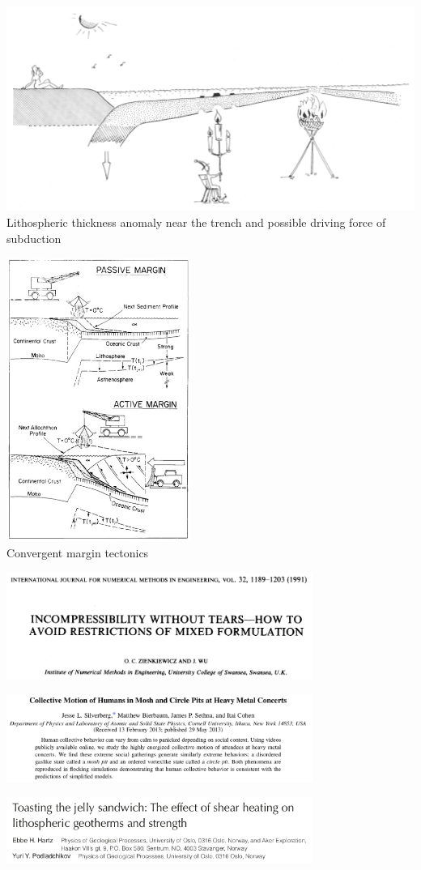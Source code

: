 \vspace{1cm}

\begin{center}
\includegraphics[width=14cm]{images/interesting/futo85}\\
{\tiny Lithospheric thickness anomaly near the trench and possible driving force of subduction \cite{futo85}}
\end{center}

\vspace{1cm}

\begin{center}
\includegraphics[width=6cm]{images/interesting/stbb86}\\
{\tiny Convergent margin tectonics \cite{stbb86}}
\end{center}


\includegraphics[width=10cm]{images/interesting/ziwu91} {\tiny \cite{ziwu91}}

\includegraphics[width=10cm]{images/interesting/sibs13} {\tiny \cite{sibs13}}

\includegraphics[width=10cm]{images/interesting/hapo08} {\tiny \cite{hapo08}}

